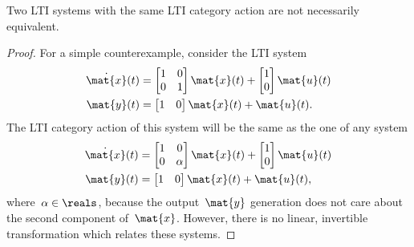 \begin{remark}
    Two LTI systems with the same LTI category action are not necessarily equivalent.
\end{remark}
\begin{proof}
    For a simple counterexample, consider the LTI system
    \begin{equation*}
        \begin{aligned}
            \dot{\mat{x}}(t) & =\begin{bmatrix} 1&0\\ 0&1 \end{bmatrix} \mat{x}(t)+\begin{bmatrix} 1\\ 0\end{bmatrix} \mat{u}(t) \\
            \mat{y}(t)       & =\begin{bmatrix} 1&0\end{bmatrix} \mat{x}(t)+\mat{u}(t).
        \end{aligned}
    \end{equation*}
    The LTI category action of this system will be the same as the one of any system
    \begin{equation*}
        \begin{aligned}
            \dot{\mat{x}}(t) & =\begin{bmatrix} 1&0\\ 0&\alpha \end{bmatrix} \mat{x}(t)+\begin{bmatrix} 1\\ 0\end{bmatrix} \mat{u}(t) \\
            \mat{y}(t)       & =\begin{bmatrix} 1&0\end{bmatrix} \mat{x}(t)+\mat{u}(t),
        \end{aligned}
    \end{equation*}
    where~$\alpha \in \reals$, because the output~$\mat{y}$ generation does not care about the second component of~$\mat{x}$.
    However, there is no linear, invertible transformation which relates these systems.
\end{proof}

